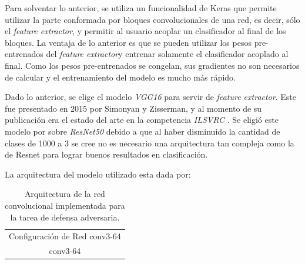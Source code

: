 \documentclass[conference]{IEEEtran}
\begin{document}
Para solventar lo anterior, se utiliza un funcionalidad de Keras que permite utilizar la parte conformada por bloques convolucionales de una red, es decir, sólo el \textit{feature extractor}, y permitir al usuario acoplar un clasificador al final de los bloques. La ventaja de lo anterior es que se pueden utilizar los pesos pre-entrenados del \textit{feature extractor}y entrenar solamente el clasificador acoplado al final. Como los pesos pre-entrenados se congelan, sus gradientes no son necesarios de calcular y el entrenamiento del modelo es mucho más rápido.

Dado lo anterior, se elige el modelo \textit{VGG16} para servir de \textit{feature extractor}. Este fue presentado en 2015 por Simonyan y Zisserman, y al momento de su publicación era el estado del arte en la competencia \textit{ILSVRC} \cite{vgg16}. Se eligió este modelo por sobre \textit{ResNet50} debido a que al haber disminuido la cantidad de clases de 1000 a 3 se cree no es necesario una arquitectura tan compleja como la de Resnet para lograr buenos resultados en clasificación.

La arquitectura del modelo utilizado esta dada por:

\begin{table}[!t]
    \centering
    \caption{Arquitectura de la red convolucional implementada para la tarea de defensa adversaria.}
    \label{defense_model}
    \begin{tabular}{c} 
    \toprule 
    Configuración de Red
    \midrule
     conv3-64 \\ conv3-64 
    \bottomrule
    \end{tabular}
\end{table}
\end{document}
